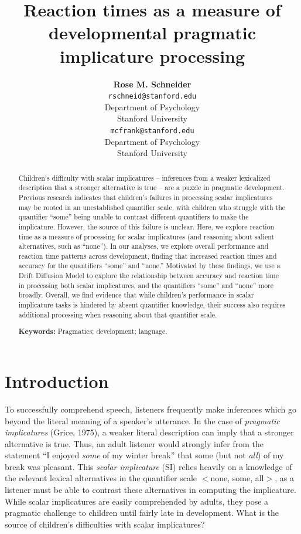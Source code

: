 \documentclass[10pt, letterpaper]{article}
\title{Reaction times as a measure of developmental pragmatic implicature
processing}
\author{{\large \bf Rose M. Schneider} \\ \texttt{rschneid@stanford.edu} \\ Department of Psychology \\ Stanford University \And {\large \bf Michael C. Frank} \\ \texttt{mcfrank@stanford.edu} \\ Department of Psychology \\ Stanford University}
\begin{document}
\maketitle

\begin{abstract}
Children's difficulty with scalar implicatures -- inferences from a
weaker lexicalized description that a stronger alternative is true --
are a puzzle in pragmatic development. Previous research indicates that
children's failures in processing scalar implicatures may be rooted in
an unestablished quantifier scale, with children who struggle with the
quantifier ``some'' being unable to contrast different quantifiers to
make the implicature. However, the source of this failure is unclear.
Here, we explore reaction time as a measure of processing for scalar
implicatures (and reasoning about salient alternatives, such as
``none''). In our analyses, we explore overall performance and reaction
time patterns across development, finding that increased reaction times
and accuracy for the quantifiers ``some'' and ``none.'' Motivated by
these findings, we use a Drift Diffusion Model to explore the
relationship between accuracy and reaction time in processing both
scalar implicatures, and the quantifiers ``some'' and ``none'' more
broadly. Overall, we find evidence that while children's performance in
scalar implicature tasks is hindered by absent quantifier knowledge,
their success also requires additional processing when reasoning about
that quantifier scale.

\textbf{Keywords:}
Pragmatics; development; language.
\end{abstract}

\section{Introduction}\label{introduction}

To successfully comprehend speech, listeners frequently make inferences
which go beyond the literal meaning of a speaker's utterance. In the
case of \emph{pragmatic implicatures} (Grice, 1975), a weaker literal
description can imply that a stronger alternative is true. Thus, an
adult listener would strongly infer from the statement ``I enjoyed
\emph{some} of my winter break'' that some (but not \emph{all}) of my
break was pleasant. This \emph{scalar implicature} (SI) relies heavily
on a knowledge of the relevant lexical alternatives in the quantifier
scale \(<\)none, some, all\(>\), as a listener must be able to contrast
these alternatives in computing the implicature. While scalar
implicatures are easily comprehended by adults, they pose a pragmatic
challenge to children until fairly late in development. What is the
source of children's difficulties with scalar implicatures?
\end{document}
